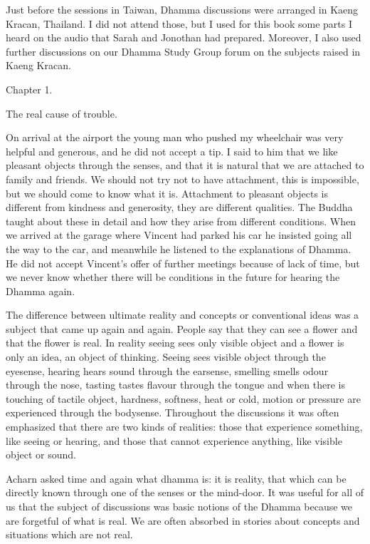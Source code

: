 \documentclass[10pt,a4paper,final]{article}
\begin{document}
Just before the sessions in Taiwan, Dhamma discussions were
arranged in Kaeng Kracan, Thailand. I did not attend those, but I used
for this book some parts I heard on the audio that Sarah and Jonothan
had prepared. Moreover, I also used further discussions on our Dhamma
Study Group forum on the subjects raised in Kaeng Kracan. 

Chapter 1.

The real cause of trouble.

On arrival at the airport the young man who pushed my
wheelchair was very helpful and generous, and he did not accept a tip. I
said to him that we like pleasant objects through the senses, and that
it is natural that we are attached to family and friends. We should not
try not to have attachment, this is impossible, but we should come to
know what it is. Attachment to pleasant objects is different from
kindness and generosity, they are different qualities. The Buddha taught
about these in detail and how they arise from different conditions. When
we arrived at the garage where Vincent had parked his car he insisted
going all the way to the car, and meanwhile he listened to the
explanations of Dhamma. He did not accept Vincent's offer of further
meetings because of lack of time, but we never know whether there will
be conditions in the future for hearing the Dhamma again. 

The difference between ultimate reality and concepts or
conventional ideas was a subject that came up again and again. People
say that they can see a flower and that the flower is real. In reality
seeing sees only visible object and a flower is only an idea, an object
of thinking. Seeing sees visible object through the eyesense, hearing
hears sound through the earsense, smelling smells odour through the
nose, tasting tastes flavour through the tongue and when there is
touching of tactile object, hardness, softness, heat or cold, motion or
pressure are experienced through the bodysense. Throughout the
discussions it was often emphasized that there are two kinds of
realities: those that experience something, like seeing or hearing, and
those that cannot experience anything, like visible object or sound. 

Acharn asked time and again what dhamma is: it is reality,
that which can be directly known through one of the senses or the
mind-door. It was useful for all of us that the subject of discussions
was basic notions of the Dhamma because we are forgetful of what is
real. We are often absorbed in stories about concepts and situations
which are not real. 
\end{document}
